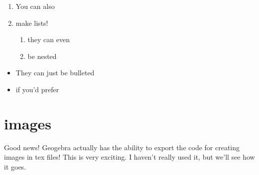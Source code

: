 \documentclass[11pt]{article}
\theoremstyle{definition}
\begin{document}
\begin{enumerate}
\item You can also
\item make lists!
\begin{enumerate}
\item they can even
\item be nested
\end{enumerate}
\end{enumerate}

\begin{itemize}
\item They can just be bulleted
\item if you'd prefer
\end{itemize}

\section{images}

Good news! Geogebra actually has the ability to export the code for creating images in tex files! This is very exciting. I haven't really used it, but we'll see how it goes.

\end{document}
